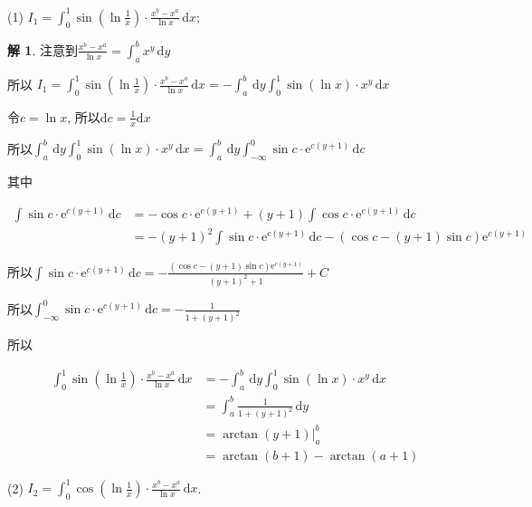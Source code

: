 \documentclass[a4paper,12pt]{article}
\theoremstyle{definition}
\newtheorem*{sol}{解}
\begin{document}
(1) $\displaystyle I_1 = \int_{0}^{1} \sin\left(\ln\frac{1}{x}\right) \cdot \frac{x^b - x^a}{\ln x} \, \mathrm{d}x$;
\begin{sol}
    注意到$\frac{x^b-x^a}{\ln x}=\int_a^b x^y\,\mathrm{d}y$

    所以 $I_1 = \int_{0}^{1} \sin\left(\ln\frac{1}{x}\right) \cdot \frac{x^b - x^a}{\ln x} \, \mathrm{d}x=-\int_a^b\,\mathrm{d}y\int_0^1\sin(\ln x)\cdot x^y\,\mathrm{d}x$

    令$c=\ln x$, 所以$\mathrm{d}c=\frac{1}{x}\mathrm{d}x$

    所以$\int_a^b\,\mathrm{d}y\int_0^1\sin(\ln x)\cdot x^y\,\mathrm{d}x=\int_a^b\,\mathrm{d}y\int_{-\infty}^0\sin c\cdot\mathrm{e}^{c(y+1)}\,\mathrm{d}c$

    其中

    \begin{align*}
        \int\sin c\cdot\mathrm{e}^{c(y+1)}\,\mathrm{d}c
         & =-\cos c\cdot\mathrm{e}^{c(y+1)}+(y+1)\int\cos c\cdot\mathrm{e}^{c(y+1)}\,\mathrm{d}c            \\
         & =-(y+1)^2\int\sin c\cdot\mathrm{e}^{c(y+1)}\,\mathrm{d}c-(\cos c-(y+1)\sin c)\mathrm{e}^{c(y+1)}
    \end{align*}

    所以$\int\sin c\cdot\mathrm{e}^{c(y+1)}\,\mathrm{d}c=-\frac{(\cos c-(y+1)\sin c)\mathrm{e}^{c(y+1)}}{(y+1)^2+1}+C$

    所以$\int_{-\infty}^0\sin c\cdot\mathrm{e}^{c(y+1)}\,\mathrm{d}c=-\frac{1}{1+(y+1)^2}$

    所以

    \begin{align*}
        \int_{0}^{1} \sin\left(\ln\frac{1}{x}\right) \cdot \frac{x^b - x^a}{\ln x} \, \mathrm{d}x
         & =-\int_a^b\,\mathrm{d}y\int_0^1\sin(\ln x)\cdot x^y\,\mathrm{d}x \\
         & =\int_a^b\frac{1}{1+(y+1)^2}\,\mathrm{d}y                        \\
         & =\arctan(y+1)|_a^b                                               \\
         & =\arctan(b+1)-\arctan(a+1)
    \end{align*}
\end{sol}
(2) $\displaystyle I_2 = \int_{0}^{1} \cos\left(\ln\frac{1}{x}\right) \cdot \frac{x^b - x^a}{\ln x} \, \mathrm{d}x$.
\end{document}
